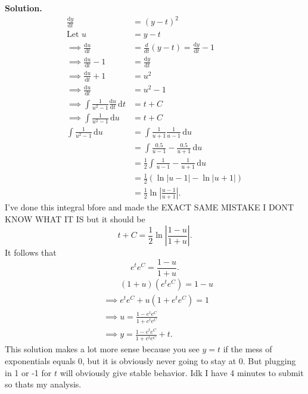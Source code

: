 \documentclass[11pt, letterpaper]{report}
\newenvironment{soln}[1][]{\noindent\textbf{Solution. }}{\hfill\qedsymbol}
\begin{document}
\begin{soln}
\begin{align*}
	\frac{\mathrm{d}y}{\mathrm{d}t} &=\left( y-t \right) ^2\\
	\text{Let }u&=y-t\\
	\implies \frac{\mathrm{d}u}{\mathrm{d}t} &=\frac{d}{dt}(y-t)=\frac{\mathrm{d}y}{\mathrm{d}t} -1\\
	\implies \frac{\mathrm{d}u}{\mathrm{d}t} -1 &= \frac{\mathrm{d}y}{\mathrm{d}t} \\
	\implies \frac{\mathrm{d}u}{\mathrm{d}t} +1&=u^2\\
	\implies \frac{\mathrm{d}u}{\mathrm{d}t} &=u^2 - 1\\
	\implies \int \frac{1}{u^2-1}\frac{\mathrm{d}u}{\mathrm{d}t}  \,\mathrm{d} t&=t+C\\
	\implies \int \frac{1}{u^2-1} \,\mathrm{d} u&=t+C\\
	\int \frac{1}{u^2-1} \,\mathrm{d} u&=\int \frac{1}{u+1}\frac{1}{u-1} \,\mathrm{d} u\\
					   &=\int \frac{0.5}{u-1}-\frac{0.5}{u+1} \,\mathrm{d} u\\
					   &=\frac{1}{2}\int \frac{1}{u-1}-\frac{1}{u+1} \,\mathrm{d} u\\
					   &=\frac{1}{2}\left( \ln \left| u-1 \right| -\ln \left| u+1 \right|  \right)\\
					   &=\frac{1}{2}\ln \left| \frac{u-1}{u+1} \right| 
.\end{align*}
I've done this integral bfore and made the EXACT SAME MISTAKE I DONT KNOW WHAT IT IS but it should be
\[
	t+C = \frac{1}{2}\ln \left| \frac{1-u}{1+u} \right| 
.\]
It follows that
\[
	e^{t}e^{C}=\frac{1-u}{1+u}
.\]
\begin{align*}
	&\qquad\left( 1+u \right) \left( e^{t}e^{C} \right) =1-u\\
	&\implies e^te^C + u\left( 1+e^te^C \right) =1\\
	&\implies u=\frac{1-e^te^C}{1+e^te^C}\\
	&\implies y=\frac{1-e^te^C}{1+e^te^C}+t
.\end{align*}
This solution makes a lot more sense because  you see  $y=t$ if the mess of exponentials equals $0$, but it is obviously never going to stay at $0$. But plugging in 1 or -1 for $t$ will obviously give stable behavior. Idk I have 4 minutes to submit so thats my analysis.
\end{soln}
\end{document}
